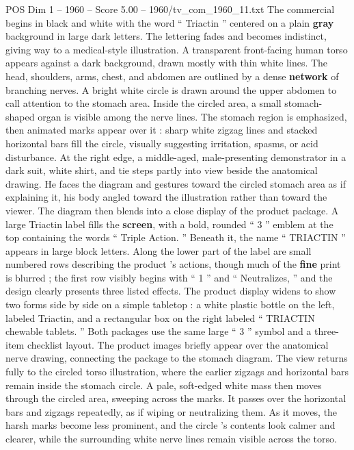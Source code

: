 \begin{textsample}{POS Dim 1 – 1960 – Score 5.00 – 1960/tv\_com\_1960\_11.txt}  \label{ex:f1_pos_075}
The commercial begins in black and white with the word “ Triactin ” centered on a plain \textbf{gray} background in large dark letters.
The lettering fades and becomes indistinct, giving way to a medical-style illustration.
A transparent front-facing human torso appears against a dark background, drawn mostly with thin white lines.
The head, shoulders, arms, chest, and abdomen are outlined by a dense \textbf{network} of branching nerves.
A bright white circle is drawn around the upper abdomen to call attention to the stomach area.
Inside the circled area, a small stomach-shaped organ is visible among the nerve lines.
The stomach region is emphasized, then animated marks appear over it : sharp white zigzag lines and stacked horizontal bars fill the circle, visually suggesting irritation, spasms, or acid disturbance.
At the right edge, a middle-aged, male-presenting demonstrator in a dark suit, white shirt, and tie steps partly into view beside the anatomical drawing.
He faces the diagram and gestures toward the circled stomach area as if explaining it, his body angled toward the illustration rather than toward the viewer.
The diagram then blends into a close display of the product package.
A large Triactin label fills the \textbf{screen}, with a bold, rounded “ 3 ” emblem at the top containing the words “ Triple Action. ” Beneath it, the name “ TRIACTIN ” appears in large block letters.
Along the lower part of the label are small numbered rows describing the product ’s actions, though much of the \textbf{fine} print is blurred ; the first row visibly begins with “ 1 ” and “ Neutralizes, ” and the design clearly presents three listed effects.
The product display widens to show two forms side by side on a simple tabletop : a white plastic bottle on the left, labeled Triactin, and a rectangular box on the right labeled “ TRIACTIN chewable tablets. ” Both packages use the same large “ 3 ” symbol and a three-item checklist layout.
The product images briefly appear over the anatomical nerve drawing, connecting the package to the stomach diagram.
The view returns fully to the circled torso illustration, where the earlier zigzags and horizontal bars remain inside the stomach circle.
A pale, soft-edged white mass then moves through the circled area, sweeping across the marks.
It passes over the horizontal bars and zigzags repeatedly, as if wiping or neutralizing them.
As it moves, the harsh marks become less prominent, and the circle ’s contents look calmer and clearer, while the surrounding white nerve lines remain visible across the torso.

\end{textsample}
